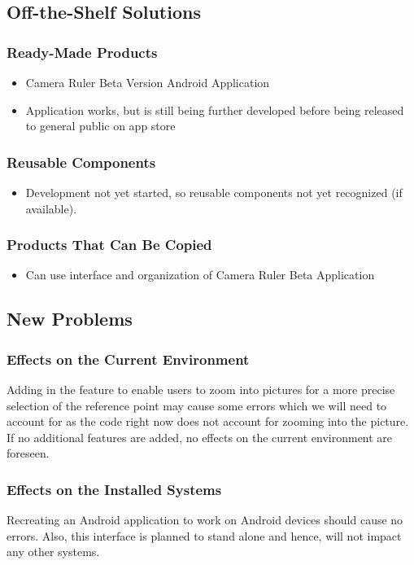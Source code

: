 \documentclass[12pt, titlepage]{article}
\begin{document}
\subsection{Off-the-Shelf Solutions}
\subsubsection{Ready-Made Products}
\begin{itemize}
\item Camera Ruler Beta Version Android Application
    \item{Application works, but is still being further developed before being released to general public on app store}
\end{itemize}

\subsubsection{Reusable Components}
\begin{itemize}
    \item Development not yet started, so reusable components not yet recognized (if available).
\end{itemize}

\subsubsection{Products That Can Be Copied}
\begin{itemize}
\item Can use interface and organization of Camera Ruler Beta Application
\end{itemize}

\subsection{New Problems}
\subsubsection{Effects on the Current Environment}
Adding in the feature to enable users to zoom into pictures for a more precise selection of the reference point may cause some errors which we will need to account for as the code right now does not account for zooming into the picture. If no additional features are added, no effects on the current environment are foreseen.

\subsubsection{Effects on the Installed Systems}
Recreating an Android application to work on Android devices should cause no errors. Also, this interface is planned to stand alone and hence, will not impact any other systems.
\end{document}
